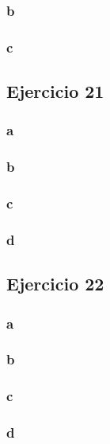 \documentclass{article}
\begin{document}
\subsubsection*{b}

\subsubsection*{c}

\subsection*{Ejercicio 21}

\subsubsection*{a}

\subsubsection*{b}

\subsubsection*{c}

\subsubsection*{d}

\subsection*{Ejercicio 22}

\subsubsection*{a}

\subsubsection*{b}

\subsubsection*{c}

\subsubsection*{d}
\end{document}
